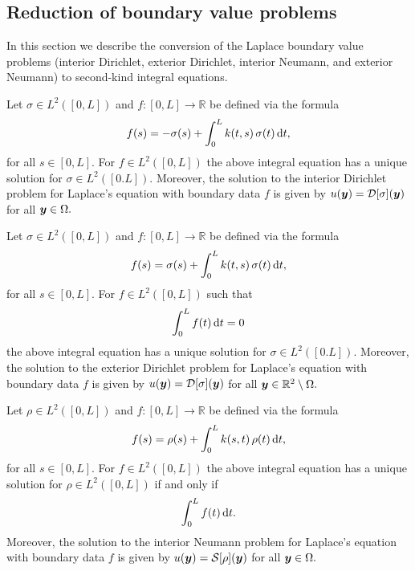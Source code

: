 \subsection{Reduction of boundary value problems}
In this section we describe the conversion of the Laplace boundary value problems (interior Dirichlet, exterior  Dirichlet, interior Neumann, and exterior Neumann) to second-kind integral equations.

\begin{theorem}
Let $\sigma \in L^2([0,L])$ and $f: [0,L] \rightarrow \mathbb{R}$ be defined via the formula
\begin{align}
f(s)= - \sigma(s)+ \int_0^L k(t,s)\,\sigma(t)\,{\rm d}t,
\label{bie_intd}
\end{align}
for all $s \in [0,L].$ For $f \in L^2([0,L])$ the above integral equation has a unique solution for $\sigma \in L^2([0.L]).$ Moreover, the solution to the interior Dirichlet problem for Laplace's equation with boundary data $f$ is given by $u(\boldsymbol{y}) = \mathcal{D}[\sigma](\boldsymbol{y})$ for all $\boldsymbol{y} \in \Omega.$
\end{theorem}

\begin{theorem}
Let $\sigma \in L^2([0,L])$ and $f: [0,L] \rightarrow \mathbb{R}$ be defined via the formula
\begin{align}
f(s)=  \sigma(s)+ \int_0^L k(t,s)\,\sigma(t)\,{\rm d}t,
\end{align}
for all $s \in [0,L].$ For $f \in L^2([0,L])$ such that
\begin{align}
\int_0^L f(t)\,{\rm d}t = 0
\end{align}
 the above integral equation has a unique solution for $\sigma \in L^2([0.L]).$ Moreover, the solution to the exterior Dirichlet problem for Laplace's equation with boundary data $f$ is given by $u(\boldsymbol{y}) = \mathcal{D}[\sigma](\boldsymbol{y})$
for all $\boldsymbol{y} \in \mathbb{R}^2 \setminus \Omega.$
\end{theorem}

\begin{theorem}
Let $\rho \in L^2([0,L])$ and $f: [0,L] \rightarrow \mathbb{R}$ be defined via the formula
\begin{align}
f(s)= \rho(s)+ \int_0^L k(s,t)\,\rho(t)\,{\rm d}t,
\end{align}
for all $s \in [0,L].$ For $f \in L^2([0,L])$ the above integral equation has a unique solution for $\rho \in L^2([0,L])$  if and only if
\begin{align}
\int_0^L f(t)\,{\rm d}t.
\end{align}
 Moreover, the solution to the interior Neumann problem for Laplace's equation with boundary data $f$ is given by $u(\boldsymbol{y}) = \mathcal{S}[\rho](\boldsymbol{y})$ for all $\boldsymbol{y} \in \Omega.$
\end{theorem}

